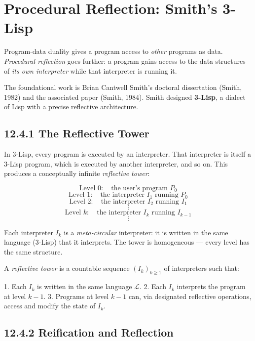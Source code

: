 \section{Procedural Reflection: Smith's 3-Lisp}

Program-data duality gives a program access to \textit{other} programs as data. \textit{Procedural reflection} goes further: a program gains access to the data structures of \textit{its own interpreter} while that interpreter is running it.

The foundational work is Brian Cantwell Smith's doctoral dissertation (Smith, 1982) and the associated paper (Smith, 1984). Smith designed \textbf{3-Lisp}, a dialect of Lisp with a precise reflective architecture.

\subsection{12.4.1 The Reflective Tower}

In 3-Lisp, every program is executed by an interpreter. That interpreter is itself a 3-Lisp program, which is executed by another interpreter, and so on. This produces a conceptually infinite \textit{reflective tower}:

\[\text{Level } 0: \quad \text{the user's program } P_0\]
\[\text{Level } 1: \quad \text{the interpreter } I_1 \text{ running } P_0\]
\[\text{Level } 2: \quad \text{the interpreter } I_2 \text{ running } I_1\]
\[\vdots\]
\[\text{Level } k: \quad \text{the interpreter } I_k \text{ running } I_{k-1}\]
\[\vdots\]

Each interpreter $I_k$ is a \textit{meta-circular} interpreter: it is written in the same language (3-Lisp) that it interprets. The tower is homogeneous --- every level has the same structure.

\begin{definition}
A \textit{reflective tower} is a countable sequence $(I_k)_{k \geq 1}$ of interpreters such that:

1. Each $I_k$ is written in the same language $\mathcal{L}$.
2. Each $I_k$ interprets the program at level $k - 1$.
3. Programs at level $k - 1$ can, via designated reflective operations, access and modify the state of $I_k$.
\end{definition}

\subsection{12.4.2 Reification and Reflection}

